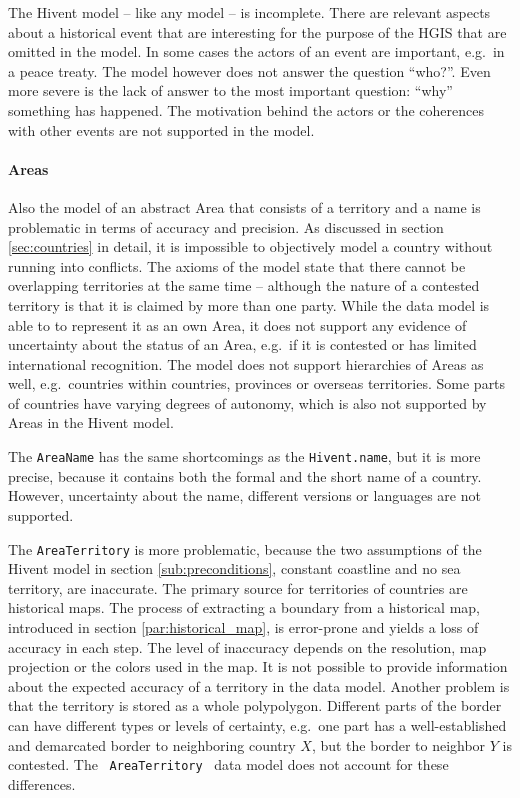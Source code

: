 The Hivent model -- like any model -- is incomplete. There are relevant aspects about a historical event that are interesting for the purpose of the HGIS that are omitted in the model. In some cases the actors of an event are important, e.g.\ in a peace treaty. The model however does not answer the question ``who?''. Even more severe is the lack of answer to the most important question: ``why'' something has happened. The motivation behind the actors or the coherences with other events are not supported in the model.


\paragraph{Areas} %
\label{par:evaluation_areas}

Also the model of an abstract Area that consists of a territory and a name is problematic in terms of accuracy and precision. As discussed in section \ref{sec:countries} in detail, it is impossible to objectively model a country without running into conflicts.
The axioms of the model state that there cannot be overlapping territories at the same time -- although the nature of a contested territory is that it is claimed by more than one party. While the data model is able to to represent it as an own Area, it does not support any evidence of uncertainty about the status of an Area, e.g.\ if it is contested or has limited international recognition.
The model does not support hierarchies of Areas as well, e.g.\ countries within countries, provinces or overseas territories. Some parts of countries have varying degrees of autonomy, which is also not supported by Areas in the Hivent model.

The \texttt{AreaName} has the same shortcomings as the \texttt{Hivent.name}, but it is more precise, because it contains both the formal and the short name of a country. However, uncertainty about the name, different versions or languages are not supported.

The \texttt{AreaTerritory} is more problematic, because the two assumptions of the Hivent model in section \ref{sub:preconditions}, constant coastline and no sea territory, are inaccurate. The primary source for territories of countries are historical maps. The process of extracting a boundary from a historical map, introduced in section \ref{par:historical_map}, is error-prone and yields a loss of accuracy in each step. The level of inaccuracy depends on the resolution, map projection or the colors used in the map.
It is not possible to provide information about the expected accuracy of a territory in the data model. Another problem is that the territory is stored as a whole polypolygon. Different parts of the border can have different types or levels of certainty, e.g.\ one part has a well-established and demarcated border to neighboring country $X$, but the border to neighbor $Y$ is contested. The ~\texttt{AreaTerritory}~ data model does not account for these differences.

